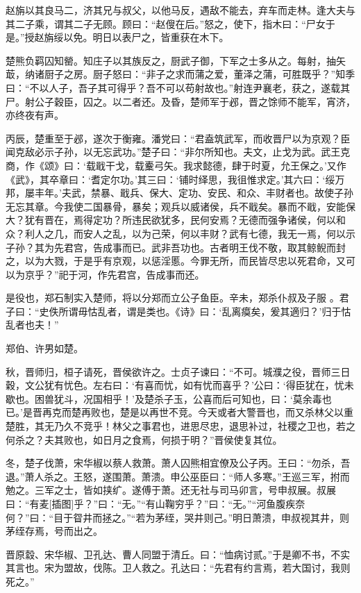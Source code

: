 \documentclass[a4paper,12pt,UTF8,twoside]{ctexbook}
\begin{document}
赵旃以其良马二，济其兄与叔父，以他马反，遇敌不能去，弃车而走林。逢大夫与其二子乘，谓其二子无顾。顾曰：“赵傁在后。”怒之，使下，指木曰：“尸女于是。”授赵旃绥以免。明日以表尸之，皆重获在木下。

楚熊负羁囚知罃。知庄子以其族反之，厨武子御，下军之士多从之。每射，抽矢菆，纳诸厨子之房。厨子怒曰：“非子之求而蒲之爱，董泽之蒲，可胜既乎？”知季曰：“不以人子，吾子其可得乎？吾不可以苟射故也。”射连尹襄老，获之，遂载其尸。射公子穀臣，囚之。以二者还。及昏，楚师军于邲，晋之馀师不能军，宵济，亦终夜有声。

丙辰，楚重至于邲，遂次于衡雍。潘党曰：“君盍筑武军，而收晋尸以为京观？臣闻克敌必示子孙，以无忘武功。”楚子曰：“非尔所知也。夫文，止戈为武。武王克商，作《颂》曰：‘载戢干戈，载櫜弓矢。我求懿德，肆于时夏，允王保之。’又作《武》，其卒章曰：‘耆定尔功。’其三曰：‘铺时绎思，我徂惟求定。’其六曰：‘绥万邦，屡丰年。’夫武，禁暴、戢兵、保大、定功、安民、和众、丰财者也。故使子孙无忘其章。今我使二国暴骨，暴矣；观兵以威诸侯，兵不戢矣。暴而不戢，安能保大？犹有晋在，焉得定功？所违民欲犹多，民何安焉？无德而强争诸侯，何以和众？利人之几，而安人之乱，以为己荣，何以丰财？武有七德，我无一焉，何以示子孙？其为先君宫，告成事而已。武非吾功也。古者明王伐不敬，取其鲸鲵而封之，以为大戮，于是乎有京观，以惩淫慝。今罪无所，而民皆尽忠以死君命，又可以为京乎？”祀于河，作先君宫，告成事而还。

是役也，郑石制实入楚师，将以分郑而立公子鱼臣。辛未，郑杀仆叔及子服 。君子曰：“史佚所谓毋怙乱者，谓是类也。《诗》曰：‘乱离瘼矣，爰其適归？’归于怙乱者也夫！”

郑伯、许男如楚。

秋，晋师归，桓子请死，晋侯欲许之。士贞子谏曰：“不可。城濮之役，晋师三日穀，文公犹有忧色。左右曰：‘有喜而忧，如有忧而喜乎？’公曰：‘得臣犹在，忧未歇也。困兽犹斗，况国相乎！’及楚杀子玉，公喜而后可知也，曰：‘莫余毒也已。’是晋再克而楚再败也，楚是以再世不竞。今天或者大警晋也，而又杀林父以重楚胜，其无乃久不竞乎！林父之事君也，进思尽忠，退思补过，社稷之卫也，若之何杀之？夫其败也，如日月之食焉，何损于明？”晋侯使复其位。

冬，楚子伐萧，宋华椒以蔡人救萧。萧人囚熊相宜僚及公子丙。王曰：“勿杀，吾退。”萧人杀之。王怒，遂围萧。萧溃。申公巫臣曰：“师人多寒。”王巡三军，拊而勉之。三军之士，皆如挟纩。遂傅于萧。还无社与司马卯言，号申叔展。叔展曰：“有麦[插图]乎？”曰：“无。”“有山鞠穷乎？”曰：“无。”“河鱼腹疾奈何？”曰：“目于眢井而拯之。”“若为茅绖，哭井则己。”明日萧溃，申叔视其井，则茅绖存焉，号而出之。

晋原縠、宋华椒、卫孔达、曹人同盟于清丘。曰：“恤病讨贰。”于是卿不书，不实其言也。宋为盟故，伐陈。卫人救之。孔达曰：“先君有约言焉，若大国讨，我则死之。”
\end{document}
